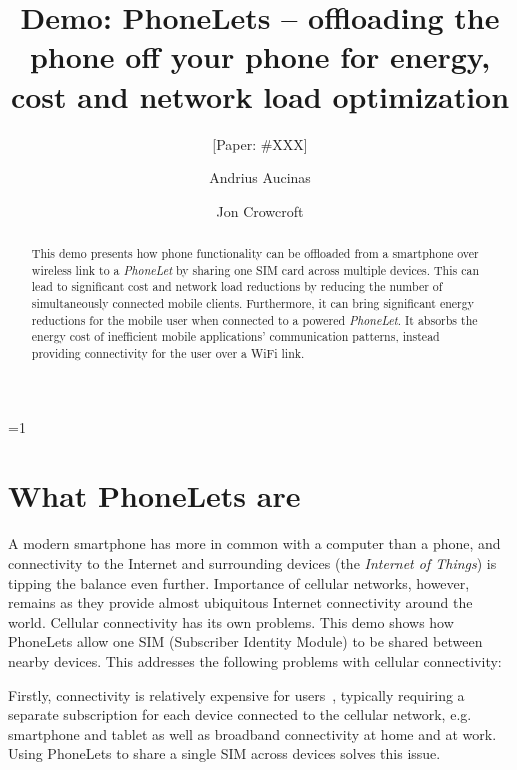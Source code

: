 \documentclass{sig-alternate-10pt}
\def\anon{0}        %
\begin{document}
\date{}


\title{Demo: PhoneLets -- offloading the phone off your phone for energy, cost and network load optimization}
\ifnum\anon=1
\author{[Paper: \#XXX]}%
\else
{}
\author{
\alignauthor Andrius Aucinas\\
\and
\alignauthor Jon Crowcroft\\
}
\fi

    
\maketitle
\begin{abstract}
This demo presents how phone functionality can be offloaded from a smartphone over wireless link to a \emph{PhoneLet} by sharing one SIM card across multiple devices. This can lead to significant cost and network load reductions by reducing the number of simultaneously connected mobile clients. Furthermore, it can bring significant energy reductions for the mobile user when connected to a powered \emph{PhoneLet}. It absorbs the energy cost of inefficient mobile applications' communication patterns, instead providing connectivity for the user over a WiFi link.
\end{abstract} 

\section{What PhoneLets are}
\label{section:intro}

A modern smartphone has more in common with a computer than a phone, and connectivity to the Internet and surrounding devices (the \emph{Internet of Things}) is tipping the balance even further. Importance of cellular networks, however, remains as they provide almost ubiquitous Internet connectivity around the world. Cellular connectivity has its own problems. This demo shows how PhoneLets allow one SIM (Subscriber Identity Module) to be shared between nearby devices. This addresses the following problems with cellular connectivity:

Firstly, connectivity is relatively expensive for users~\cite{Anonymous:2013ut}, typically requiring a separate subscription for each device connected to the cellular network, e.g. smartphone and tablet as well as broadband connectivity at home and at work. Using PhoneLets to share a single SIM across devices solves this issue.
\end{document}
